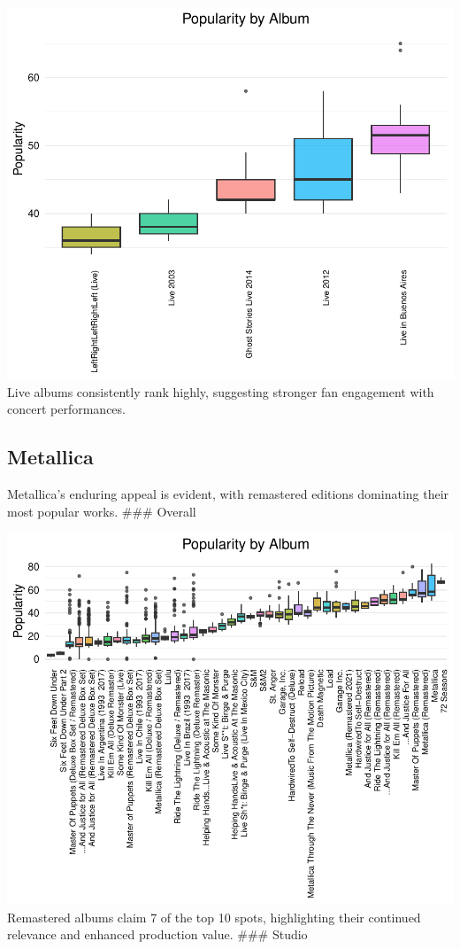 \documentclass[11pt,preprint]{elsarticle}
\numberwithin{equation}{section}
\numberwithin{figure}{section}
\numberwithin{table}{section}
\begin{document}
\includegraphics{Question2_files/figure-latex/unnamed-chunk-2-1.pdf}
Live albums consistently rank highly, suggesting stronger fan engagement
with concert performances.

\newpage

\subsection{Metallica}\label{metallica}

Metallica's enduring appeal is evident, with remastered editions
dominating their most popular works. \#\#\# Overall

\includegraphics{Question2_files/figure-latex/unnamed-chunk-3-1.pdf}
Remastered albums claim 7 of the top 10 spots, highlighting their
continued relevance and enhanced production value. \#\#\# Studio
\end{document}
